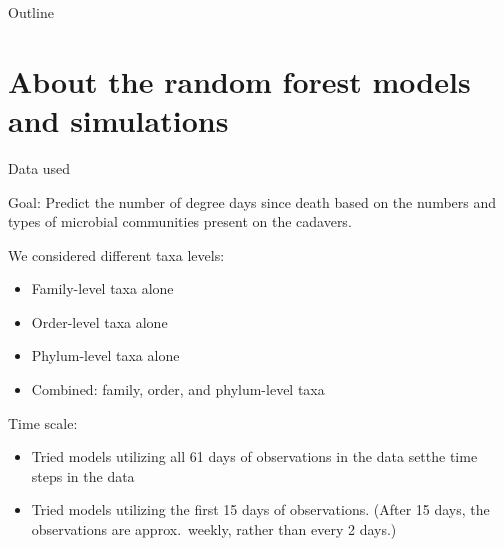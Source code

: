 \documentclass{beamer}
\begin{document}

\begin{frame}{Outline}
  \tableofcontents
\end{frame}








\section[Background]{About the random forest models and simulations}

\begin{frame}{Data used}

{\footnotesize

\noindent Goal: Predict the number of degree days since death based on
the numbers and types of microbial communities present on the cadavers.

\vspace{0.1in}

\noindent We considered different taxa levels:
\begin{itemize}
\item Family-level taxa alone
\item Order-level taxa alone
\item Phylum-level taxa alone
\item Combined: family, order, and phylum-level taxa
\end{itemize}

\vspace{0.1in}

\noindent Time scale:
\begin{itemize}
\item Tried models utilizing all 61 days of observations in the data setthe time steps in the data
\item Tried models utilizing the first 15 days of observations. (After
  15 days, the observations are approx.~weekly, rather than every 2
  days.)
\end{itemize}
}

\end{frame}
\end{document}
